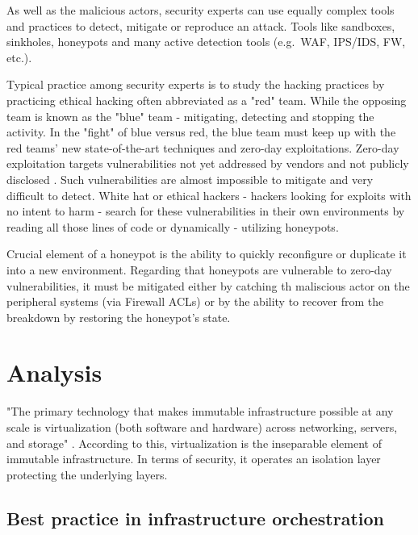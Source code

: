 \documentclass[12pt,a4paper,twoside]{report}
\begin{document}
As well as the malicious actors, security experts can use equally complex tools and practices to detect, mitigate or reproduce an attack.
Tools like sandboxes, sinkholes, honeypots and many active detection tools (e.g.~WAF, IPS/IDS, FW, etc.). 

Typical practice among security experts is to study the hacking practices by practicing ethical hacking often abbreviated as a "red" team. While the opposing team is known as the "blue" team - mitigating, detecting and stopping the activity. In the "fight" of blue versus red, the blue team must keep up with the red teams' new state-of-the-art techniques and zero-day exploitations. Zero-day exploitation targets vulnerabilities not yet addressed by vendors and not publicly disclosed
\cite{research:symantec:zero-day}. Such vulnerabilities are almost impossible to mitigate and very difficult to detect. White hat or ethical hackers - hackers looking for exploits with no intent to harm - search for these vulnerabilities in their own environments by reading all those lines of code or dynamically - utilizing honeypots.

Crucial element of a honeypot is the ability to quickly reconfigure or duplicate it into a new environment. Regarding that honeypots are vulnerable to zero-day vulnerabilities, it must be mitigated either by catching th maliscious actor on the peripheral systems (via Firewall ACLs) or by the ability to recover from the breakdown by restoring the honeypot's state.

\chapter{Analysis}\label{analysis}

"The primary technology that makes immutable infrastructure possible at any scale is virtualization (both software and hardware) across networking, servers, and storage" \cite{research:sumologic:immutable-infra}. According to this, virtualization is the inseparable element of immutable infrastructure. In terms of security, it operates an isolation layer protecting the underlying layers.

\section{Best practice in infrastructure orchestration}\label{immutable-infrastructure-and-its-orchestration}
\end{document}
